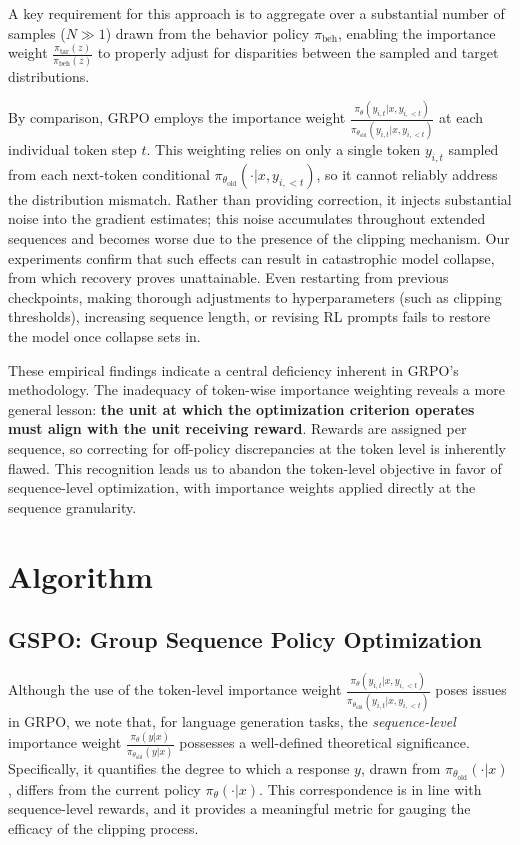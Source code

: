 A key requirement for this approach is to aggregate over a substantial number of samples ($N \gg 1$) drawn from the behavior policy $\pi_\text{beh}$, enabling the importance weight $\frac{ \pi_\text{tar} (z) }{ \pi_\text{beh} (z)}$ to properly adjust for disparities between the sampled and target distributions.

By comparison, GRPO employs the importance weight $\frac{ \pi_{\theta} (y_{i,t} | x, y_{i,<t}) }{ \pi_{\theta_\text{old}} (y_{i,t} | x,y_{i,<t})}$ at each individual token step $t$. This weighting relies on only a single token $y_{i,t}$ sampled from each next-token conditional $\pi_{\theta_\text{old}}( \cdot | x, y_{i, <t})$, so it cannot reliably address the distribution mismatch. Rather than providing correction, it injects substantial noise into the gradient estimates; this noise accumulates throughout extended sequences and becomes worse due to the presence of the clipping mechanism. Our experiments confirm that such effects can result in catastrophic model collapse, from which recovery proves unattainable. Even restarting from previous checkpoints, making thorough adjustments to hyperparameters (such as clipping thresholds), increasing sequence length, or revising RL prompts fails to restore the model once collapse sets in.

These empirical findings indicate a central deficiency inherent in GRPO's methodology. The inadequacy of token-wise importance weighting reveals a more general lesson: \textbf{the unit at which the optimization criterion operates must align with the unit receiving reward}. Rewards are assigned per sequence, so correcting for off-policy discrepancies at the token level is inherently flawed. This recognition leads us to abandon the token-level objective in favor of sequence-level optimization, with importance weights applied directly at the sequence granularity.

\section{Algorithm}

\subsection{GSPO: Group Sequence Policy Optimization}

Although the use of the token-level importance weight $\frac{ \pi_{\theta} (y_{i,t} | x, y_{i,<t}) }{ \pi_{\theta_\text{old}} (y_{i,t} | x,y_{i,<t})}$ poses issues in GRPO, we note that, for language generation tasks, the \textit{sequence-level} importance weight $\frac{ \pi_{\theta} (y | x) }{ \pi_{\theta_\text{old}} (y | x)}$ possesses a well-defined theoretical significance. Specifically, it quantifies the degree to which a response $y$, drawn from $\pi_{\theta_\text{old}} (\cdot | x)$, differs from the current policy $\pi_{\theta} (\cdot | x)$. This correspondence is in line with sequence-level rewards, and it provides a meaningful metric for gauging the efficacy of the clipping process.

